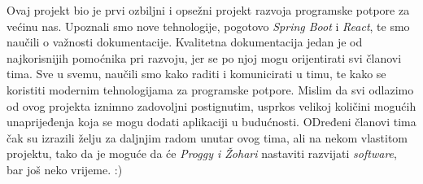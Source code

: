 		Ovaj projekt bio je prvi ozbiljni i opsežni projekt razvoja programske potpore za većinu nas. Upoznali smo nove tehnologije, pogotovo \textit{Spring Boot} i \textit{React}, te smo naučili o važnosti dokumentacije. Kvalitetna dokumentacija jedan je od najkorisnijih pomoćnika pri razvoju, jer se po njoj mogu orijentirati svi članovi tima. Sve u svemu, naučili smo kako raditi i komunicirati u timu, te kako se koristiti modernim tehnologijama za programske potpore. Mislim da svi odlazimo od ovog projekta iznimno zadovoljni postignutim, usprkos velikoj količini mogućih unaprijeđenja koja se mogu dodati aplikaciji u budućnosti. ODređeni članovi tima čak su izrazili želju za daljnjim radom unutar ovog tima, ali na nekom vlastitom projektu, tako da je moguće da će \textit{Proggy i Žohari} nastaviti razvijati \textit{software}, bar još neko vrijeme. :)
		
		\eject 